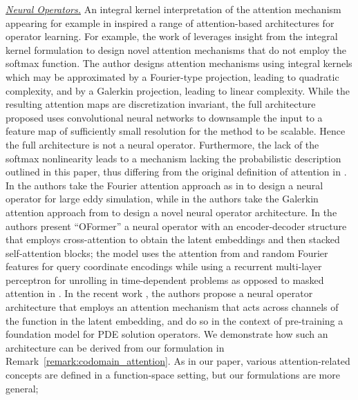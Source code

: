 \documentclass[twoside]{article}
\newcommand{\1}{\mathbbm{1}}
\begin{document}
\par \uline{\textit{Neural Operators.}} An integral kernel interpretation of the attention mechanism appearing for example in \citet{tsai2019transformer, martins2020sparse,moreno2022kernel,wright2021transformers,cao2021choose,kovachki2023neural} inspired a range of attention-based architectures for operator learning. For example, the work of \citet{cao2021choose} leverages insight from the integral kernel formulation to design novel attention mechanisms that do not employ the softmax function. The author designs attention mechanisms using integral kernels which may be approximated by a Fourier-type projection, leading to quadratic complexity, and by a Galerkin projection, leading to linear complexity. While the resulting attention maps are discretization invariant, the full architecture proposed uses convolutional neural networks to downsample the input to a feature map of sufficiently small resolution for the method to be scalable. Hence the full architecture is not a neural operator. Furthermore, the lack of the softmax nonlinearity leads to a mechanism lacking the probabilistic description outlined in this paper, thus differing from the original definition of attention in \citet{vaswani2017attention}. In \cite{li2024transformer} the authors take the Fourier attention approach as in \cite{cao2021choose} to design a neural operator for large eddy simulation, while in \cite{luo2024hierarchical} the authors take the Galerkin attention approach from \cite{cao2021choose} to design a novel neural operator architecture. In \citet{li2023transformer} the authors present ``OFormer'' a neural operator with an encoder-decoder structure that employs cross-attention to obtain the latent embeddings and then stacked self-attention blocks; the model uses the attention from \citet{cao2021choose} and random Fourier features for query coordinate encodings while using a recurrent multi-layer perceptron for unrolling in time-dependent problems as opposed to masked attention in \citet{vaswani2017attention}. In the recent work \citet{rahman2024pretraining}, the authors propose a neural operator architecture that employs an attention mechanism that acts across channels of the function in the latent embedding, and do so in the context of pre-training a foundation model for PDE solution operators. We demonstrate how such an architecture can be derived from our formulation in Remark~\ref{remark:codomain_attention}. As in our paper, various attention-related concepts are
defined in a function-space setting, but our formulations are more general;
\end{document}
